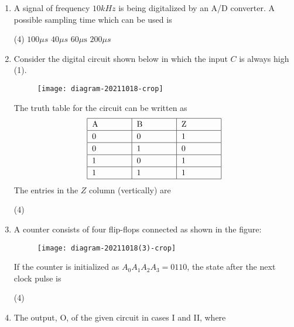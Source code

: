 \begin{enumerate}
	\item A signal of frequency $10 k H z$ is being digitalized by an A/D converter. A possible sampling time which can be used is
	{	}
	\begin{tasks}(4)
		\task[\textbf{A.}] $100 \mu s$
		\task[\textbf{B.}] $40 \mu s$
		\task[\textbf{C.}] $60 \mu \mathrm{s}$
		\task[\textbf{D.}] $200 \mu s$
	\end{tasks}
	\item Consider the digital circuit shown below in which the input $C$ is always high (1).\\
	\begin{figure}[H]
		\centering
		\texttt{[image: diagram-20211018-crop]}
	\end{figure}
	The truth table for the circuit can be written as
	\begin{align*}
	\renewcommand*{\arraystretch}{1.2}
	\begin{tabular}{|p{1.5cm}|p{1.5cm}|p{1.5cm}|}
	\hline $\mathrm{A}$ & $\mathrm{B}$ & $\mathrm{Z}$ \\
	\hline 0 & 0 & 1 \\
	\hline 0 & 1 & 0 \\
	\hline 1 & 0 & 1 \\
	\hline 1 & 1 & 1 \\
	\hline
	\end{tabular}
	\end{align*}
	The entries in the $Z$ column (vertically) are
	{	}
	\begin{tasks}(4)
	\end{tasks}
	\item A counter consists of four flip-flops connected as shown in the figure:\\
	\begin{figure}[H]
		\centering
		\texttt{[image: diagram-20211018(3)-crop]}
	\end{figure}
	If the counter is initialized as $A_{0} A_{1} A_{2} A_{3}=0110$, the state after the next clock pulse is
	{}
	\begin{tasks}(4)
	\end{tasks}
	\item The output, $\mathrm{O}$, of the given circuit in cases I and II, where\\

\end{enumerate}
